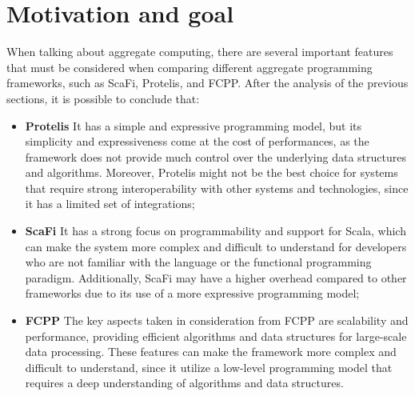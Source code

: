 \section{Motivation and goal}
When talking about aggregate computing, there are several important features that must be considered when comparing different aggregate programming frameworks, such as ScaFi, Protelis, and FCPP.\newline
After the analysis of the previous sections, it is possible to conclude that:
\begin{itemize}
    \item \textbf{Protelis}\newline
    It has a simple and expressive programming model, but its simplicity and expressiveness come at the cost of performances, as the framework does not provide much control over the underlying data structures and algorithms. Moreover, Protelis might not be the best choice for systems that require strong interoperability with other systems and technologies, since it has a limited set of integrations;
    \item \textbf{ScaFi}\newline
    It has a strong focus on programmability and support for Scala, which can make the system more complex and difficult to understand for developers who are not familiar with the language or the functional programming paradigm. Additionally, ScaFi may have a higher overhead compared to other frameworks due to its use of a more expressive programming model;
    \item \textbf{FCPP}\newline
    The key aspects taken in consideration from FCPP are scalability and performance, providing efficient algorithms and data structures for large-scale data processing. These features can make the framework more complex and difficult to understand, since it utilize a low-level programming model that requires a deep understanding of algorithms and data structures.
\end{itemize}

